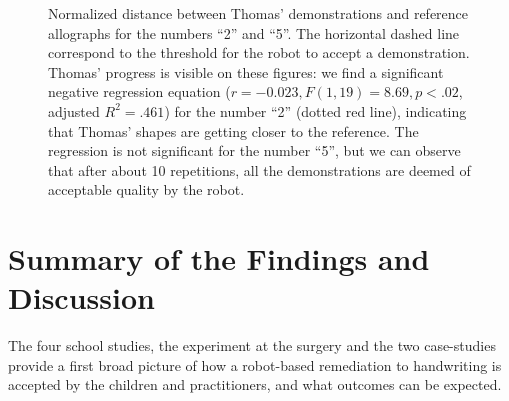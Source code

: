 \documentclass{article}
\begin{document}
\begin{figure}
    \centering
    \caption{\small Normalized distance between Thomas' demonstrations and
        reference allographs for the numbers ``2'' and ``5''. The horizontal
        dashed line correspond to the threshold for the robot to accept a
        demonstration. Thomas' progress is visible on these figures: we find a
        significant negative regression equation ($r=-0.023, F(1,19)=8.69,
        p<.02$, adjusted $R^2=.461$) for the number ``2'' (dotted red line),
        indicating that Thomas' shapes are getting closer to the reference. The
        regression is not significant for the number ``5'', but we can observe
        that after about 10 repetitions, all the demonstrations are deemed of
        acceptable quality by the robot.  }

    \label{Thomas_progress}
\end{figure}

\section{Summary of the Findings and Discussion}

The four school studies, the experiment at the surgery and the two case-studies
provide a first broad picture of how a robot-based remediation to handwriting is
accepted by the children and practitioners, and what outcomes can be expected.
\end{document}
